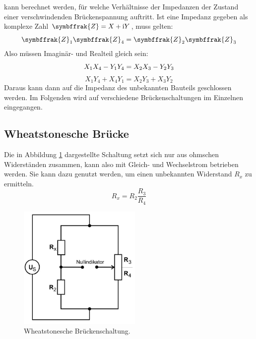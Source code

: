 kann berechnet werden, für welche Verhältnisse der Impedanzen der Zustand einer verschwindenden Brückenspannung auftritt.
Ist eine Impedanz gegeben als komplexe Zahl $\symbffrak{Z} = X + \text{i}Y$, muss gelten:
\begin{equation}
  \symbffrak{Z}_1 \symbffrak{Z}_4 = \symbffrak{Z}_2 \symbffrak{Z}_3
  \label{eqn:gl1}
\end{equation}
Also müssen Imaginär- und Realteil gleich sein:
\begin{equation}
  X_1 X_4 - Y_1 Y_4 = X_2 X_3 - Y_2 Y_3 \\
  \label{eqn:gl2}
\end{equation}
\begin{equation}
  X_1 Y_4 + X_4 Y_1 = X_2 Y_3 + X_3 Y_2
  \label{eqn:gl3}
\end{equation}
Daraus kann dann auf die Impedanz des unbekannten Bauteils geschlossen werden.
Im Folgenden wird auf verschiedene Brückenschaltungen im Einzelnen eingegangen.

\subsection{Wheatstonesche Brücke}
\label{sec:Theorie1}
Die in Abbildung \ref{fig:Schaltung2} dargestellte Schaltung setzt sich nur aus ohmschen Widerständen zusammen, kann also mit Gleich- und Wechselstrom betrieben werden.
Sie kann dazu genutzt werden, um einen unbekannten Widerstand $R_x$ zu ermitteln.
\begin{equation}
  R_x = R_2 \frac{R_3}{R_4}
  \label{eqn:gl4}
\end{equation}
\begin{figure}
  \includegraphics[height=6cm]{data/Schaltung2.jpg}
  \centering
  \caption{Wheatstonesche Brückenschaltung.}
  \label{fig:Schaltung2}
\end{figure}
\FloatBarrier

